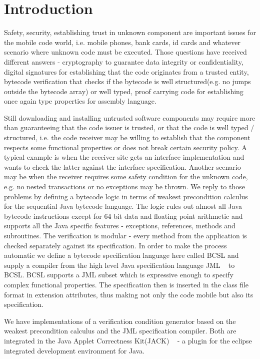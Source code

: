 
\section{Introduction}\label{intro}
Safety, security, establishing trust in unknown component are important issues for the mobile code world, i.e. mobile phones, bank cards, id cards and whatever scenario where 
unknown code must be executed. Those questions have received different answers - cryptography to guarantee data integrity or confidentiality,
 digital signatures for establishing that the code originates from a trusted entity, bytecode verification that checks if the bytecode is well structured(e.g. no jumps outside the bytecode array) or well typed, proof carrying code for establishing once again type properties for assembly language.  

Still downloading and installing untrusted software components may require more than guaranteeing that the code issuer is trusted, or that the code is well typed / structured, i.e. the code receiver may be willing to establish that the component respects some functional properties or does not break certain security policy. 
A typical example is when the receiver site gets an interface implementation and wants to check the latter against the interface specification. Another scenario may be when the receiver requires some safety condition for the unknown code, e.g. no nested transactions or no exceptions may be thrown.  
We reply to those problems by defining a bytecode logic in terms of weakest precondition calculus for the sequential Java bytecode language. The logic rules out almost all Java bytecode instructions except for 64 bit data and floating point arithmetic and supports all the Java specific features - exceptions, references, methods and subroutines. The verification is modular  -  every method from the application is checked separately against its specification. In order to make the process automatic we define a bytecode specification language here called BCSL and supply a compiler from the high level Java specification language JML ~\cite{JMLRefMan} to BCSL. BCSL supports a JML subset which is expressive enough to specify complex functional properties. The specification then is inserted in the class file format in extension attributes, thus making not only the code mobile but also its specification.

We have implementations of a verification condition generator based on the weakest precondition calculus and the JML specification compiler. Both are integrated in the Java Applet Correctness Kit(JACK) ~\cite{BRL-JACK} - a plugin for the eclipse integrated development environment for Java.

